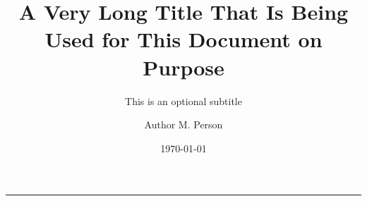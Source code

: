 \documentclass[11pt]{curie}
\title[Title for the Header]{A Very Long Title That Is Being Used for This Document on Purpose}
\subtitle{This is an optional subtitle}
\author{Author M. Person}
\affiliation{Some Affiliation, City}
\date{\today}
\begin{document}
\pagestyle{fancy-first}

\tableofcontents
\clearpage



\begin{center}
\vspace*{0.5em}
\rule{0.8\textwidth}{0.8pt}
\end{center}

\clearpage
\nocite{*}
{\small }

\appendix



\end{document}
